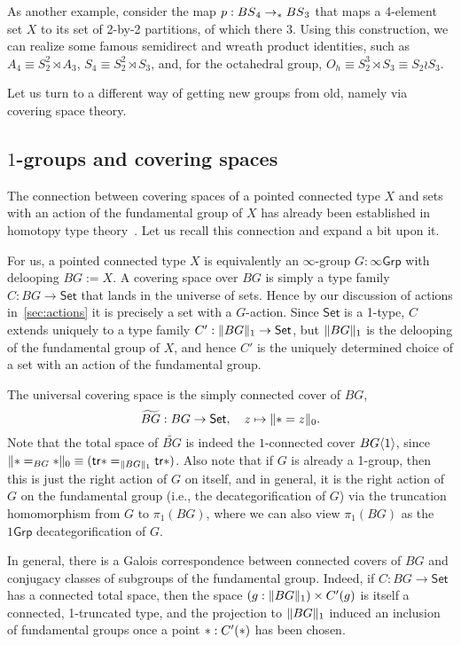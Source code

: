 As another example,
consider the map $p : \BS_4 \to_\pt \BS_3$ that maps a 4-element set
$X$ to its set of 2-by-2 partitions, of which there $3$. Using this
construction, we can realize some famous semidirect and wreath product identities,
such as $A_4 \equiv S_2^2 \rtimes A_3$, $S_4 \equiv S_2^2 \rtimes
S_3$, and, for the octahedral group, $O_h \equiv S_2^3 \rtimes S_3
\equiv S_2 \wr S_3$.

\smallskip

Let us turn to a different way of getting new groups from old, namely
via covering space theory.

\subsection{\texorpdfstring{$1$}{1}-groups and covering spaces}
\label{sec:covering}

The connection between covering spaces of a pointed connected type
$X$ and sets with an action of the fundamental group of $X$ has
already been established in homotopy type
theory~\cite{FavoniaHarper2016}. Let us recall this connection and
expand a bit upon it.

For us, a pointed connected type $X$ is equivalently
an $\infty$-group $G:\infty\mathsf{Grp}$
with delooping $BG := X$.
A covering space over $BG$ is simply a type family $C : BG \to \mathsf{Set}$
that lands in the universe of sets.
Hence by our discussion of actions in~\autoref{sec:actions}
it is precisely a set with a $G$-action.
Since $\mathsf{Set}$ is a 1-type, $C$ extends uniquely to a type family
$C' : \trunc{1}{BG} \to \mathsf{Set}$,
but $\trunc{1}{BG}$ is the delooping of the fundamental group
of $X$, and hence $C'$ is the uniquely determined
choice of a set with an action of the fundamental group.

The universal covering space is the simply connected cover of $BG$,
\[
  \widetilde{BG} : BG \to \mathsf{Set}, \quad
  z \mapsto \trunc{0}{\pt = z}.
\]
Note that the total space of $\widetilde{BG}$ is indeed the
$1$-connected cover $BG\angled1$,
since $\trunc{0}{\pt =_{BG} \pt} \equiv (\tr{\pt} =_{\trunc{1}{BG}} \tr{\pt})$.
Also note that if $G$ is already a 1-group, then this is just the right
action of $G$ on itself, and in general, it is the right action of $G$
on the fundamental group
(i.e., the decategorification of $G$)
via the truncation homomorphism from $G$ to $\pi_1(BG)$,
where we can also view $\pi_1(BG)$ as the $1\mathsf{Grp}$ decategorification
of $G$.

In general, there is a Galois correspondence between connected covers
of $BG$ and conjugacy classes of subgroups of the fundamental group.
Indeed, if $C : BG \to \mathsf{Set}$ has a connected total space,
then the space $(g : \trunc{1}{BG}) \times C'(g)$
is itself a connected, 1-truncated type,
and the projection to $\trunc{1}{BG}$
induced an inclusion of fundamental groups
once a point $\pt : C'(\pt)$ has been chosen.

